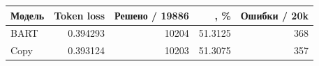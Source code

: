 \begin{tabular}{lrrrr}
\toprule
Модель & Token loss & Решено / 19886 & \pass{}, \% & Ошибки / 20k \\
\midrule
BART & 0.394293 & 10204 & 51.3125 & 368 \\
Copy & 0.393124 & 10203 & 51.3075 & 357 \\
\bottomrule
\end{tabular}

